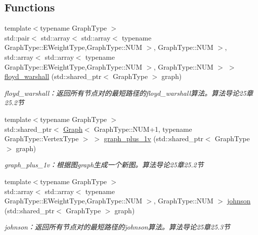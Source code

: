 \subsection*{Functions}
\begin{DoxyCompactItemize}
\item 
{\footnotesize template$<$typename Graph\+Type $>$ }\\std\+::pair$<$ std\+::array$<$ std\+::array$<$ typename Graph\+Type\+::\+E\+Weight\+Type,Graph\+Type\+::\+N\+U\+M $>$, Graph\+Type\+::\+N\+U\+M $>$, std\+::array$<$ std\+::array$<$ typename Graph\+Type\+::\+E\+Weight\+Type,Graph\+Type\+::\+N\+U\+M $>$, Graph\+Type\+::\+N\+U\+M $>$ $>$ \hyperlink{namespace_introduction_to_algorithm_1_1_graph_algorithm_ab951caca0797ff2907a180fe81609c70}{floyd\+\_\+warshall} (std\+::shared\+\_\+ptr$<$ Graph\+Type $>$ graph)
\begin{DoxyCompactList}\small\item\em floyd\+\_\+warshall：返回所有节点对的最短路径的floyd\+\_\+warshall算法。算法导论25章25.2节 \end{DoxyCompactList}\item 
{\footnotesize template$<$typename Graph\+Type $>$ }\\std\+::shared\+\_\+ptr$<$ \hyperlink{struct_introduction_to_algorithm_1_1_graph_algorithm_1_1_graph}{Graph}$<$ Graph\+Type\+::\+N\+U\+M+1, typename Graph\+Type\+::\+Vertex\+Type $>$ $>$ \hyperlink{namespace_introduction_to_algorithm_1_1_graph_algorithm_a267d39a5bb09200f37a1cd2f0ad4f69f}{graph\+\_\+plus\+\_\+1v} (std\+::shared\+\_\+ptr$<$ Graph\+Type $>$ graph)
\begin{DoxyCompactList}\small\item\em graph\+\_\+plus\+\_\+1v：根据图graph生成一个新图。算法导论25章25.2节 \end{DoxyCompactList}\item 
{\footnotesize template$<$typename Graph\+Type $>$ }\\std\+::array$<$ std\+::array$<$ typename Graph\+Type\+::\+E\+Weight\+Type,Graph\+Type\+::\+N\+U\+M $>$, Graph\+Type\+::\+N\+U\+M $>$ \hyperlink{namespace_introduction_to_algorithm_1_1_graph_algorithm_a856b132d068d0553355203a16cdec97d}{johnson} (std\+::shared\+\_\+ptr$<$ Graph\+Type $>$ graph)
\begin{DoxyCompactList}\small\item\em johnson：返回所有节点对的最短路径的johnson算法。算法导论25章25.3节 \end{DoxyCompactList}\item 

\end{DoxyCompactItemize}
